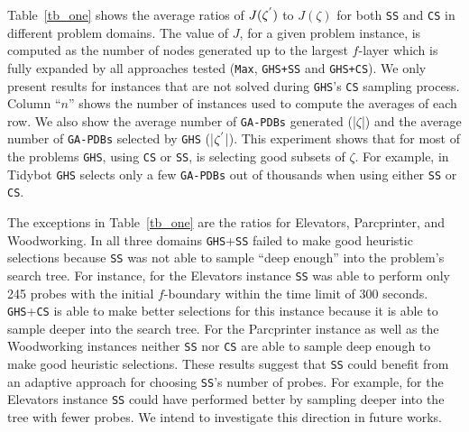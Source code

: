 Table~\ref{tb_one} shows the average ratios of $J(\zeta\sp{'})$ to $J(\zeta)$ for both \texttt{SS} and \texttt{CS} in different problem domains. The value of $J$, for a given problem instance, is computed as the number of nodes generated up to the largest $f$-layer which is fully expanded by all approaches tested (\texttt{Max}, \texttt{GHS+SS} and \texttt{GHS+CS}). We only present results for instances that are not solved during \texttt{GHS}'s \texttt{CS} sampling process. Column ``$n$'' shows the number of instances used to compute the averages of each row. We also show the average number of \texttt{GA-PDBs} generated (|$\zeta$|) and the average number of \texttt{GA-PDBs} selected by \texttt{GHS} (|$\zeta\sp{'}$|). This experiment shows that for most of the problems \texttt{GHS}, using \texttt{CS} or \texttt{SS}, is selecting good subsets of $\zeta$. For example, in Tidybot \texttt{GHS} selects only a few \texttt{GA-PDBs} out of thousands when using either \texttt{SS} or \texttt{CS}.


The exceptions in Table~\ref{tb_one} are the ratios for Elevators, Parcprinter, and Woodworking. In all three domains \texttt{GHS}+\texttt{SS} failed to make good heuristic selections because \texttt{SS} was not able to sample ``deep enough'' into the problem's search tree. For instance, for the Elevators instance \texttt{SS} was able to perform only 245 probes with the initial $f$-boundary within the time limit of 300 seconds. \texttt{GHS}+\texttt{CS} is able to make better selections for this instance because it is able to sample deeper into the search tree. For the Parcprinter instance as well as the Woodworking instances neither \texttt{SS} nor \texttt{CS} are able to sample deep enough to make good heuristic selections. These results suggest that \texttt{SS} could benefit from an adaptive approach for choosing \texttt{SS}'s number of probes. For example, for the Elevators instance \texttt{SS} could have performed better by sampling deeper into the tree with fewer probes. We intend to investigate this direction in future works.



